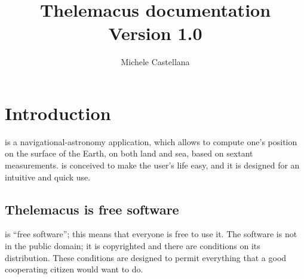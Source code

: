 \documentclass[]{book}
\title{Thelemacus documentation\\
\large{Version 1.0}}
\author{Michele Castellana}
\newcommand{\mycaption}[2]{\caption[#1]{\textbf{#1}. #2}}
\begin{document}
 

\maketitle 

\pagebreak
\tableofcontents

\chapter{Introduction}

\thel  is a navigational-astronomy application, which allows to compute one's position on the surface of the Earth, on both land and sea, based on sextant measurements. \thel is conceived to make the user's life easy, and it is designed for an intuitive and quick use. 

\section{Thelemacus is free software}

\thel is ``free software''; this means that everyone is free to use it. The software is not in the public domain; it is copyrighted and there are conditions on its distribution. These conditions are designed to permit everything that a good cooperating citizen would want to do.



\printacronyms[pages={display=none,seq/use=false}]




\end{document}
